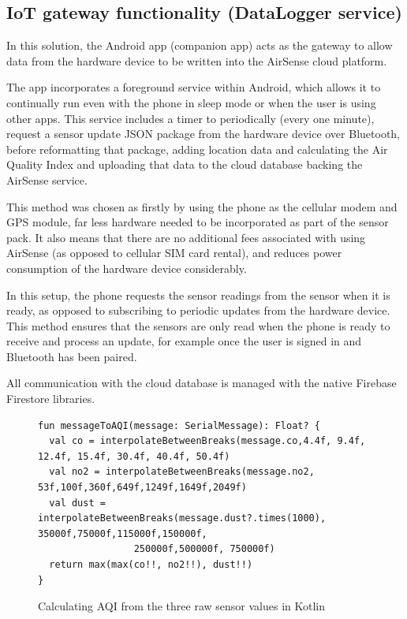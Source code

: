 \documentclass[sigconf, nonacm]{acmart}
\begin{document}
\subsection{IoT gateway functionality (DataLogger service)}

In this solution, the Android app (companion app) acts as the gateway to allow data from the
hardware device to be written into the AirSense cloud platform.

The app incorporates a foreground service within Android, which allows it to continually run
even with the phone in sleep mode or when the user is using other apps. This service includes
a timer to periodically (every one minute), request a sensor update JSON package from the 
hardware device over Bluetooth, before reformatting that package, adding location data and 
calculating the Air Quality Index and uploading that data to the cloud database backing
the AirSense service.

This method was chosen as firstly by using the phone as the cellular modem and GPS module, 
far less hardware needed to be incorporated as part of the sensor pack. It also means that
there are no additional fees associated with using AirSense (as opposed to cellular SIM card
rental), and reduces power consumption of the hardware device considerably.

In this setup, the phone requests the sensor readings from the sensor when it is ready, as 
opposed to subscribing to periodic updates from the hardware device. This method ensures that
the sensors are only read when the phone is ready to receive and process an update, for 
example once the user is signed in and Bluetooth has been paired.

All communication with the cloud database is managed with the native Firebase Firestore 
libraries.\cite{firebase_firestore}

\begin{figure}
\begin{verbatim}
fun messageToAQI(message: SerialMessage): Float? {
  val co = interpolateBetweenBreaks(message.co,4.4f, 9.4f, 12.4f, 15.4f, 30.4f, 40.4f, 50.4f)
  val no2 = interpolateBetweenBreaks(message.no2, 53f,100f,360f,649f,1249f,1649f,2049f)
  val dust = interpolateBetweenBreaks(message.dust?.times(1000), 35000f,75000f,115000f,150000f,
                 250000f,500000f, 750000f)
  return max(max(co!!, no2!!), dust!!)
}
\end{verbatim}
\caption{Calculating AQI from the three raw sensor values in Kotlin}
\label{fig:aqicalc}
\end{figure}
\end{document}
